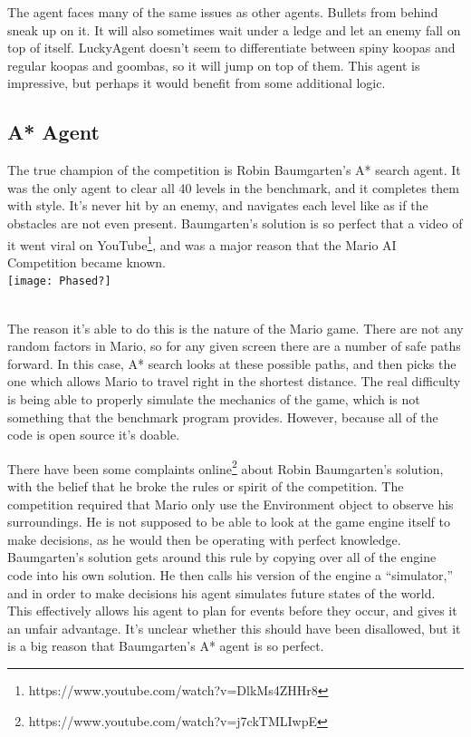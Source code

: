 \documentclass[12pt]{article}
\begin{document}
\begin{multicols*}{2}
The agent faces many of the same issues as other agents.  Bullets from behind sneak up on it.  It 
will also sometimes wait under a ledge and let an enemy fall on top of itself.  LuckyAgent doesn't seem 
to differentiate between spiny koopas and regular koopas and goombas, so it will jump on top of them.  
This agent is impressive, but perhaps it would benefit from some additional logic.

\subsection*{A* Agent}
The true champion of the competition is Robin Baumgarten's A* search agent.  It was the only agent 
to clear all 40 levels in the benchmark, and it completes them with style.  It's never hit by an enemy, 
and navigates each level like as if the obstacles are not even present.  Baumgarten's solution is 
so perfect that a video of it went viral on YouTube\footnote{
https://www.youtube.com/watch?v=DlkMs4ZHHr8}, and was a major reason that the 
Mario AI Competition became known.
\hspace{5mm}
\\

\begingroup
    \centering
    \texttt{[image: Phased?]}
\endgroup

\hspace{5mm}
\\
\indent The reason it's able to do this is the nature of the Mario game.  There are not any random factors in 
Mario, so for any given screen there are a number of safe paths forward.  In this case, A* search 
looks at these possible paths, and then picks the one which allows Mario to travel right in the shortest 
distance.  The real difficulty is being able to properly simulate the mechanics of the game, which is 
not something that the benchmark program provides.  However, because all of the code is open source 
it's doable.

There have been some complaints online\footnote{
https://www.youtube.com/watch?v=j7ckTMLIwpE} 
about Robin Baumgarten's solution, with the belief that 
he broke the rules or spirit of the competition.  The competition required that Mario only use the 
Environment object to observe his surroundings.  He is not supposed to be able to look at the game 
engine itself to make decisions, as he would then be operating with perfect knowledge.  
Baumgarten's solution gets around this rule by copying over all of the engine code into his own 
solution.  He then calls his version of the engine a ``simulator,'' and in order to make decisions 
his agent simulates future states of the world.  This effectively allows his agent to plan for events 
before they occur, and gives it an unfair advantage.  It's unclear whether this should have been 
disallowed, but it is a big reason that Baumgarten's A* agent is so perfect.


\end{multicols*}
\end{document}
